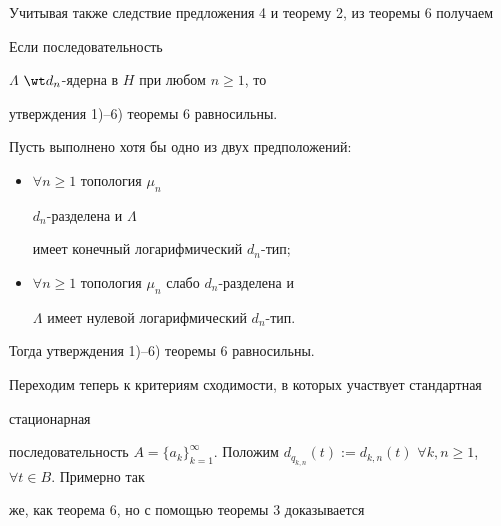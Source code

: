Учитывая также следствие предложения 4 и теорему 2, из теоремы 6 получаем





\begin{cor}


Если последовательность


$\Lambda$\; $\wt d_n$-ядерна в $H$ при любом $n\geqslant 1$, то


утверждения 1)--6) теоремы 6 равносильны.


\end{cor}





\begin{cor}


Пусть выполнено хотя бы одно из двух предположений:


\begin{itemize}


\item[(i)$_0$] $\forall n\geqslant 1$ топология $\mu_n$\;


$d_n$-разделена и $\Lambda$


имеет конечный логарифмический $d_n$-тип;


\item[(ii)$_0$]


$\forall n\geqslant 1$ топология $\mu_n$\; слабо $d_n$-разделена и


$\Lambda$ имеет нулевой логарифмический $d_n$-тип.


\end{itemize}


Тогда утверждения 1)--6) теоремы 6 равносильны.


\end{cor}





Переходим теперь к критериям сходимости, в которых участвует стандартная


стационарная


последовательность $A=\{a_k\}_{k=1}^{\infty}$. Положим $d_{q_{k,n}}


(t):=d_{k,n}(t)$ $\forall k,n\geqslant 1$, $\forall t\in B$. Примерно так


же, как теорема 6, но с помощью теоремы 3 доказывается





